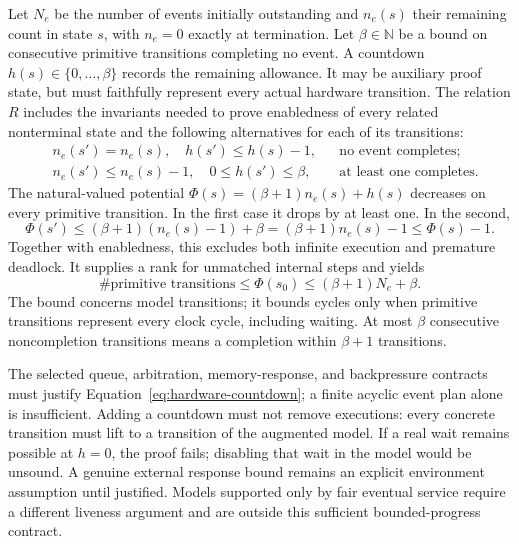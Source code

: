\documentclass[11pt]{article}
\begin{document}
Let $N_e$ be the number of events initially outstanding and $n_e(s)$ their remaining count in state $s$, with $n_e=0$ exactly at termination. Let $\beta\in\mathbb N$ be a bound on consecutive primitive transitions completing no event. A countdown $h(s)\in\{0,\ldots,\beta\}$ records the remaining allowance. It may be auxiliary proof state, but must faithfully represent every actual hardware transition. The relation $R$ includes the invariants needed to prove enabledness of every related nonterminal state and the following alternatives for each of its transitions:
\begin{equation}
 \begin{aligned}
 &n_e(s')=n_e(s),\quad h(s')\le h(s)-1,
 &&\text{no event completes};\\
 &n_e(s')\le n_e(s)-1,\quad 0\le h(s')\le\beta,
 &&\text{at least one completes}.
 \end{aligned}
 \label{eq:hardware-countdown}
\end{equation}
The natural-valued potential $\Phi(s)=(\beta+1)n_e(s)+h(s)$ decreases on every primitive transition. In the first case it drops by at least one. In the second,
\begin{equation}
 \Phi(s')\le(\beta+1)(n_e(s)-1)+\beta
 = (\beta+1)n_e(s)-1\le\Phi(s)-1.
\end{equation}
Together with enabledness, this excludes both infinite execution and premature deadlock. It supplies a rank for unmatched internal steps and yields
\begin{equation}
 \#\text{primitive transitions}\le\Phi(s_0)
 \le(\beta+1)N_e+\beta.
 \label{eq:hardware-step-bound}
\end{equation}
The bound concerns model transitions; it bounds cycles only when primitive transitions represent every clock cycle, including waiting. At most $\beta$ consecutive noncompletion transitions means a completion within $\beta+1$ transitions.

The selected queue, arbitration, memory-response, and backpressure contracts must justify Equation~\ref{eq:hardware-countdown}; a finite acyclic event plan alone is insufficient. Adding a countdown must not remove executions: every concrete transition must lift to a transition of the augmented model. If a real wait remains possible at $h=0$, the proof fails; disabling that wait in the model would be unsound. A genuine external response bound remains an explicit environment assumption until justified. Models supported only by fair eventual service require a different liveness argument and are outside this sufficient bounded-progress contract.
\end{document}
